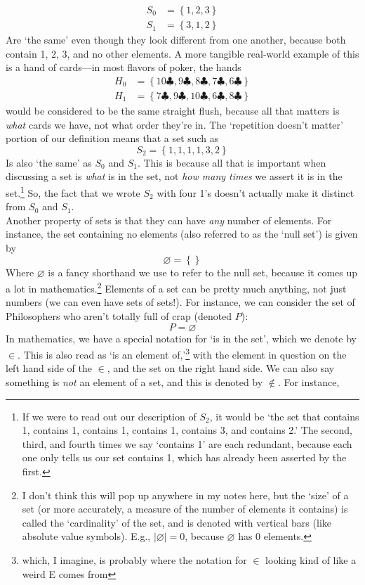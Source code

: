 \documentclass[10pt]{article}
\theoremstyle{definition}
\newcommand{\set}[1]{\left\{ #1 \right\}}
\begin{document}
\begin{align*}
S_0 &= \set{1,2,3}\\
S_1 &= \set{3,1,2}
\end{align*}
Are `the same' even though they look different from one another, because both contain 1, 2, 3, and no other elements.  A more tangible real-world example of this is a hand of cards---in most flavors of poker, the hands
\begin{align*}
H_0 &= \set{10\clubsuit,9\clubsuit, 8\clubsuit, 7\clubsuit, 6\clubsuit}\\
H_1 &= \set{7\clubsuit,9\clubsuit, 10\clubsuit, 6\clubsuit, 8\clubsuit}
\end{align*}
would be considered to be the same straight flush, because all that matters is \emph{what} cards we have, not what order they're in.  The `repetition doesn't matter' portion of our definition means that a set such as
\[S_2 = \set{1,1,1,1,3,2}\]
Is also `the same' as $S_0$ and $S_1$.  This is because all that is important when discussing a set is \emph{what} is in the set, not \emph{how many times} we assert it is in the set.\footnote{If we were to read out our description of $S_2$, it would be `the set that contains 1, contains 1, contains 1, contains 1, contains 3, and contains 2.'  The second, third, and fourth times we say `contains 1' are each redundant, because each one only tells us our set contains 1, which has already been asserted by the first.}  So, the fact that we wrote $S_2$ with four 1's doesn't actually make it distinct from $S_0$ and $S_1$.
\\
Another property of sets is that they can have \emph{any} number of elements.  For instance, the set containing no elements (also referred to as the `null set') is given by
\[\varnothing = \set{}\]
Where $\varnothing$ is a fancy shorthand we use to refer to the null set, because it comes up a lot in mathematics.\footnote{I don't think this will pop up anywhere in my notes here, but the `size' of a set (or more accurately, a measure of the number of elements it contains) is called the `cardinality' of the set, and is denoted with vertical bars (like absolute value symbols).  E.g., $|\varnothing| = 0$, because $\varnothing$ has 0 elements.}
Elements of a set can be pretty much anything, not just numbers (we can even have sets of sets!).  For instance, we can consider the set of Philosophers who aren't totally full of crap (denoted $P$):
\[P = \varnothing\]
In mathematics, we have a special notation for `is in the set', which we denote by $\in$.  This is also read as `is an element of,'\footnote{which, I imagine, is probably where the notation for $\in$ looking kind of like a weird E comes from} with the element in question on the left hand side of the $\in$, and the set on the right hand side.  We can also say something is \emph{not} an element of a set, and this is denoted by $\notin$.  For instance,
\end{document}
